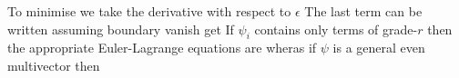 To minimise we take the derivative with respect to $\epsilon$
The last term can be written
assuming boundary vanish get
If $\psi_i$ contains only terms of grade-$r$ then the appropriate
Euler-Lagrange equations are
wheras if $\psi$ is a general even multivector then
\eq{
\d_\psi \L = (\d_{\del \psi}\L) \rdel
}
%
%
%
%
%
%
%
%
%
%
%
%
%
